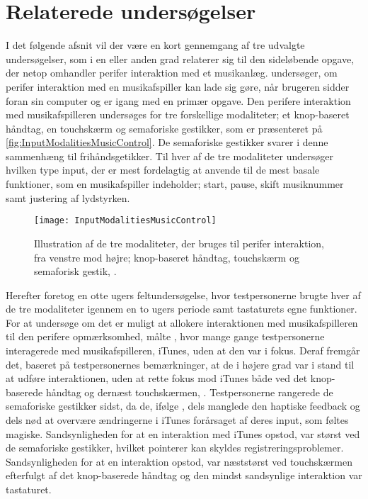 \section{Relaterede undersøgelser}
\label{RelateretUndersoegelser}
%
I det følgende afsnit vil der være en kort gennemgang af tre udvalgte undersøgelser, som i en eller anden grad relaterer sig til den sideløbende opgave, der netop omhandler perifer interaktion med et musikanlæg.\blankline
%
\textcite{PDF:ComparingInputModalities} undersøger, om perifer interaktion med en musikafspiller kan lade sig gøre, når brugeren sidder foran sin computer og er igang med en primær opgave. Den perifere interaktion med musikafspilleren undersøges for tre forskellige modaliteter; et knop-baseret håndtag, en touchskærm og semaforiske gestikker, som er præsenteret på \autoref{fig:InputModalitiesMusicControl}. De semaforiske gestikker svarer i denne sammenhæng til frihåndsgetikker. Til hver af de tre modaliteter undersøger \textcite[ss. 165-166]{PDF:ComparingInputModalities} hvilken type input, der er mest fordelagtig at anvende til de mest basale funktioner, som en musikafspiller indeholder; start, pause, skift musiknummer samt justering af lydstyrken.  
%
\begin{figure}[H]
	\centering
	\texttt{[image: InputModalitiesMusicControl]}
	\caption{Illustration af de tre modaliteter, der bruges til perifer interaktion, fra venstre mod højre; knop-baseret håndtag, touchskærm og semaforisk gestik, \parencite[s. 163]{PDF:ComparingInputModalities}.}
	\label{fig:InputModalitiesMusicControl}
\end{figure}
\noindent
%
Herefter foretog \textcite[ss. 169-174]{PDF:ComparingInputModalities} en otte ugers feltundersøgelse, hvor testpersonerne brugte hver af de tre modaliteter igennem en to ugers periode samt tastaturets egne funktioner. For at undersøge om det er muligt at allokere interaktionen med musikafspilleren til den perifere opmærksomhed, målte \textcite[ss. 172-173]{PDF:ComparingInputModalities}, hvor mange gange testpersonerne interagerede med musikafspilleren, iTunes, uden at den var i fokus. Deraf fremgår det, baseret på testpersonernes bemærkninger, at de i højere grad var i stand til at udføre interaktionen, uden at rette fokus mod iTunes både ved det knop-baserede håndtag og dernæst touchskærmen, \parencite[ss. 172]{PDF:ComparingInputModalities}. Testpersonerne rangerede de semaforiske gestikker sidst, da de, ifølge \textcite[ss. 172-173]{PDF:ComparingInputModalities}, dels manglede den haptiske feedback og dels nød at overvære ændringerne i iTunes forårsaget af deres input, som føltes magiske. Sandsynligheden for at en interaktion med iTunes opstod, var størst ved de semaforiske gestikker, hvilket \textcite[s. 171]{PDF:ComparingInputModalities} pointerer kan skyldes registreringsproblemer. Sandsynligheden for at en interaktion opstod, var næststørst ved touchskærmen efterfulgt af det knop-baserede håndtag og den mindst sandsynlige interaktion var tastaturet. 

